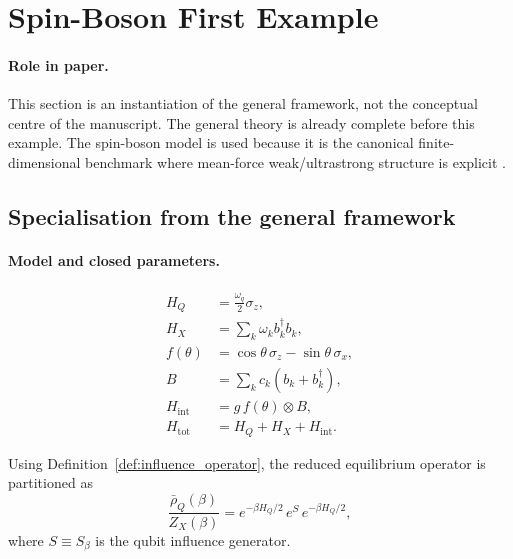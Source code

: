 \section{Spin-Boson First Example}
\label{sec:spin_boson_example}

\paragraph{Role in paper.}
This section is an instantiation of the general framework, not the conceptual centre of the
manuscript. The general theory is already complete before this example.
The spin-boson model is used because it is the canonical finite-dimensional benchmark where
mean-force weak/ultrastrong structure is explicit
\cite{leggettDynamicsDissipativeTwostate1987,cresserWeakUltrastrongCoupling2021a}.

\subsection{Specialisation from the general framework}

\paragraph{Model and closed parameters.}
\begin{align}
  H_Q &= \frac{\omega_q}{2}\sigma_z, \\
  H_X &= \sum_k \omega_k b_k^\dagger b_k, \\
  f(\theta) &= \cos\theta\,\sigma_z - \sin\theta\,\sigma_x, \\
  B &= \sum_k c_k(b_k+b_k^\dagger), \\
  H_{\mathrm{int}} &= g\,f(\theta)\otimes B, \\
  H_{\mathrm{tot}} &= H_Q + H_X + H_{\mathrm{int}}.
\end{align}

Using Definition~\ref{def:influence_operator}, the reduced equilibrium operator is partitioned as
\begin{equation}
  \frac{\bar{\rho}_Q(\beta)}{Z_X(\beta)}
  = e^{-\beta H_Q/2}\,e^S\,e^{-\beta H_Q/2},
\end{equation}
where \(S\equiv S_\beta\) is the qubit influence generator.

